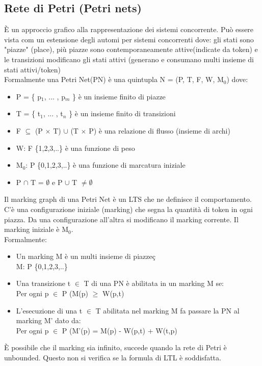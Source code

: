 \documentclass[12pt]{article}
\begin{document}
\subsection{Rete di Petri (Petri nets)}
È un approccio grafico alla rappresentazione dei sistemi concorrente. Può essere vista com un estensione degli automi per sistemi concorrenti dove: gli stati sono "piazze" (place), più piazze sono contemporaneamente attive(indicate da token) e le transizioni modificano gli stati attivi (generano e consumano multi insieme di stati attivi/token)
\\ Formalmente una Petri Net(PN) è una quintupla N = (P, T, F, W, M$_0$) dove:
\begin{itemize}
    \item P = \{ p$_1$, ... , p$_m$ \} è un insieme finito di piazze
    \item T = \{ t$_1$, ... , t$_n$ \} è un insieme finito di transizioni
    \item F $\subseteq$ (P $\times$ T) $\cup$ (T $\times$ P) è una relazione di flusso (insieme di archi)
    \item W: F \{1,2,3,..\} è una funzione di peso
    \item M$_0$: P \{0,1,2,3,..\} è una funzione di marcatura iniziale
    \item P $\cap$ T = $\emptyset$ e P $\cup$ T $\neq \emptyset$
\end{itemize}
Il marking graph di una Petri Net è un LTS che ne definisce il comportamento. C'è una configurazione iniziale (marking) che segna la quantità di token in ogni piazza. Da una configurazione all'altra si modificano il marking corrente. Il marking iniziale è M$_0$.
\\ Formalmente: 
\begin{itemize}
    \item Un marking M è un multi insieme di piazzeç 
        \\ M: P \{0,1,2,3,..\}
    \item Una transizione t $\in$ T di una PN è abilitata in un marking M se: 
        \\Per ogni p $\in$ P    (M(p) $\geq$ W(p,t)
    \item L'esecuzione di una t $\in$ T abilitata nel marking M fa passare la PN al marking M' dato da: 
        \\ Per ogni p $\in$ P    (M'(p) = M(p) - W(p,t) + W(t,p)
\end{itemize}
È possibile che il marking sia infinito, succede quando la rete di Petri è unbounded. Questo non si verifica se la formula di LTL è soddisfatta.
\end{document}
